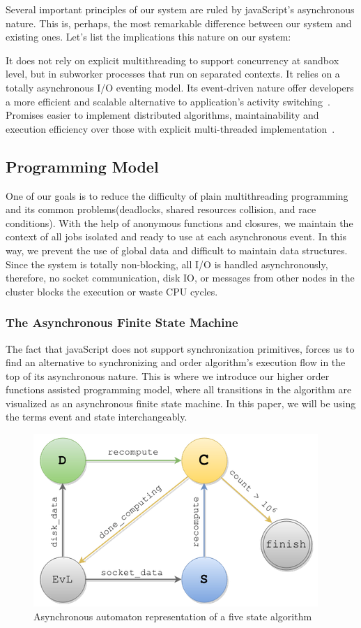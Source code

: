 \documentclass[10pt,reprint]{socc14}
\begin{document}
Several important principles of our system are ruled by javaScript’s asynchronous nature. This is, perhaps, the most remarkable difference between our system and existing ones. Let's list the implications this nature on our system:

It does not rely on explicit multithreading to support concurrency at sandbox level, but in subworker processes that run on separated contexts.
It relies on a totally asynchronous I/O eventing model.
Its event-driven nature offer developers a more efficient and scalable alternative to application’s activity switching~\cite{Tilkov2010}.
Promises easier to implement distributed algorithms, maintainability and execution efficiency over those with explicit multi-threaded implementation~\cite{Tilkov2010}. 

\subsection{Programming Model}
One of our goals is to reduce the difficulty of plain multithreading programming and its common problems(deadlocks, shared resources collision, and race conditions). With the help of anonymous functions and closures, we maintain the context of all jobs isolated and ready to use at each asynchronous event. In this way, we prevent the use of global data and difficult to maintain data structures. Since the system is totally non-blocking, all I/O is handled asynchronously, therefore, no socket communication, disk IO, or messages from other nodes in the cluster blocks the execution or waste CPU cycles.

\subsubsection{The Asynchronous Finite State Machine}
The fact that javaScript does not support synchronization primitives, forces us to find an alternative to synchronizing and order algorithm’s execution flow in the top of its asynchronous nature. This is where we introduce our higher order functions assisted programming model, where all transitions in the algorithm are visualized as an asynchronous finite state machine. In this paper, we will be using the terms event and state interchangeably.

\begin{figure}[h]	
	\centering
	\includegraphics[scale=0.55]{AsynchronousAutomaton}
	\caption{Asynchronous automaton representation of a five state algorithm}
\end{figure}
\end{document}
